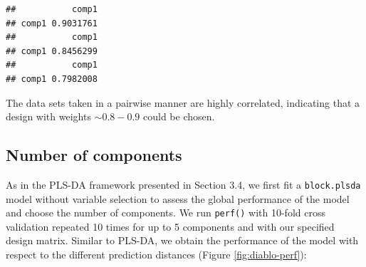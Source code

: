 \documentclass[]{book}
\newenvironment{Shaded}{\begin{snugshade}}{\end{snugshade}}
\newcommand{\DataTypeTok}[1]{\textcolor[rgb]{0.13,0.29,0.53}{#1}}
\newcommand{\DecValTok}[1]{\textcolor[rgb]{0.00,0.00,0.81}{#1}}
\newcommand{\KeywordTok}[1]{\textcolor[rgb]{0.13,0.29,0.53}{\textbf{#1}}}
\newcommand{\NormalTok}[1]{#1}
\newcommand{\OperatorTok}[1]{\textcolor[rgb]{0.81,0.36,0.00}{\textbf{#1}}}
\newcommand{\StringTok}[1]{\textcolor[rgb]{0.31,0.60,0.02}{#1}}
\begin{document}
\begin{Shaded}
\end{Shaded}

\begin{verbatim}
##           comp1
## comp1 0.9031761
##           comp1
## comp1 0.8456299
##           comp1
## comp1 0.7982008
\end{verbatim}

The data sets taken in a pairwise manner are highly correlated, indicating that a design with weights \(\sim 0.8 - 0.9\) could be chosen.

\hypertarget{number-of-components}{%
\subsection{Number of components}\label{number-of-components}}

As in the PLS-DA framework presented in Section 3.4, we first fit a \texttt{block.plsda} model without variable selection to assess the global performance of the model and choose the number of components. We run \texttt{perf()} with 10-fold cross validation repeated 10 times for up to 5 components and with our specified design matrix. Similar to PLS-DA, we obtain the performance of the model with respect to the different prediction distances (Figure \ref{fig:diablo-perf}):
\end{document}
